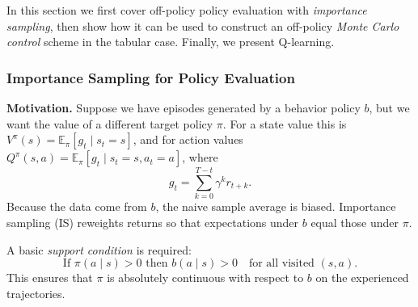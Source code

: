 \documentclass[
]{book}
\theoremstyle{definition}
\theoremstyle{definition}
\theoremstyle{definition}
\theoremstyle{definition}
\theoremstyle{remark}
\begin{document}
In this section we first cover off-policy policy evaluation with \emph{importance sampling}, then show how it can be used to construct an off-policy \emph{Monte Carlo control} scheme in the tabular case. Finally, we present Q-learning.

\subsubsection{Importance Sampling for Policy Evaluation}\label{importance-sampling-for-policy-evaluation}

\textbf{Motivation.} Suppose we have episodes generated by a behavior policy \(b\), but we want the value of a different target policy \(\pi\). For a state value this is \(V^\pi(s) = \mathbb{E}_\pi[g_t \mid s_t=s]\), and for action values \(Q^\pi(s,a) = \mathbb{E}_\pi[g_t \mid s_t=s, a_t=a]\), where
\[
g_t = \sum_{k=0}^{T-t} \gamma^{k} r_{t+k}.
\]
Because the data come from \(b\), the naive sample average is biased. Importance sampling (IS) reweights returns so that expectations under \(b\) equal those under \(\pi\).

A basic \emph{support condition} is required:
\begin{equation}
\text{If } \pi(a\mid s) > 0 \text{ then } b(a\mid s) > 0 \quad \text{for all visited } (s,a).
\label{eq:IS-SupportCondition}
\end{equation}
This ensures that \(\pi\) is absolutely continuous with respect to \(b\) on the experienced trajectories.
\end{document}
